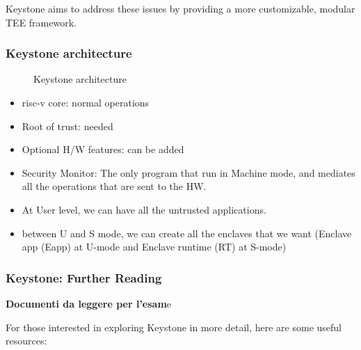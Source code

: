 Keystone aims to address these issues by providing a more customizable, modular TEE framework.

\subsubsection{Keystone architecture}
\begin{figure}[h]
    \centering
    \caption{Keystone architecture}
    \label{fig:keystone_architecture}
\end{figure}

\begin{itemize}
    \item risc-v core: normal operations
    \item Root of trust: needed
    \item Optional H/W features: can be added
    \item Security Monitor: The only program that run in Machine mode, and mediates all the operations that are sent to the HW.
    \item At User level, we can have all the untrusted applications.
    \item between U and S mode, we can create all the enclaves that we want (Enclave app (Eapp) at U-mode and Enclave runtime (RT) at S-mode)
\end{itemize}

\subsubsection{Keystone: Further Reading}

\begin{boxH}
    \textbf{Documenti da leggere per l'esam}e
\end{boxH}

For those interested in exploring Keystone in more detail, here are some useful resources:

